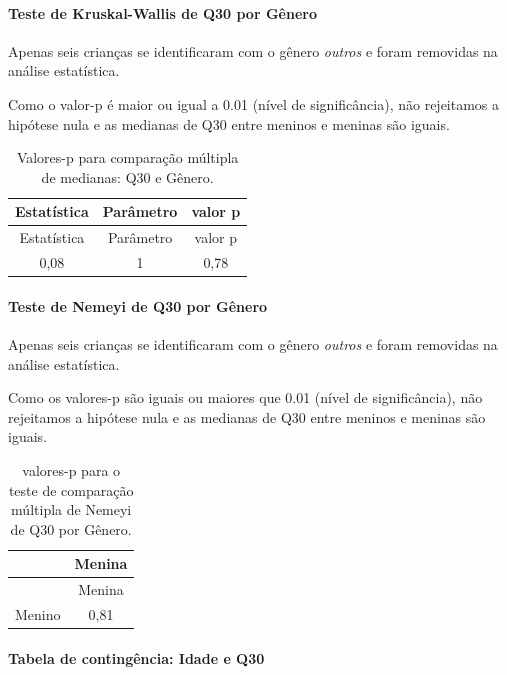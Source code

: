 \documentclass[]{article}
\let\oldparagraph\paragraph
\renewcommand{\paragraph}[1]{\oldparagraph{#1}\mbox{}}
\begin{document}
\hypertarget{teste-de-kruskal-wallis-de-q30-por-guxeanero}{%
\paragraph{Teste de Kruskal-Wallis de Q30 por Gênero}\label{teste-de-kruskal-wallis-de-q30-por-guxeanero}}

Apenas seis crianças se identificaram com o gênero \emph{outros} e foram removidas na análise estatística.

Como o valor-p é maior ou igual a 0.01 (nível de significância), não rejeitamos a hipótese nula e as medianas de Q30 entre meninos e meninas são iguais.

\begin{longtable}[]{@{}ccc@{}}
\caption{\label{tab:unnamed-chunk-973}Valores-p para comparação múltipla de medianas: Q30 e Gênero.}\tabularnewline
\toprule
Estatística & Parâmetro & valor p\tabularnewline
\midrule
\endfirsthead
\toprule
Estatística & Parâmetro & valor p\tabularnewline
\midrule
\endhead
0,08 & 1 & 0,78\tabularnewline
\bottomrule
\end{longtable}

\hypertarget{teste-de-nemeyi-de-q30-por-guxeanero}{%
\paragraph{Teste de Nemeyi de Q30 por Gênero}\label{teste-de-nemeyi-de-q30-por-guxeanero}}

Apenas seis crianças se identificaram com o gênero \emph{outros} e foram removidas na análise estatística.

Como os valores-p são iguais ou maiores que 0.01 (nível de significância), não rejeitamos a hipótese nula e as medianas de Q30 entre meninos e meninas são iguais.

\begin{longtable}[]{@{}lc@{}}
\caption{\label{tab:unnamed-chunk-975}valores-p para o teste de comparação múltipla de Nemeyi de Q30 por Gênero.}\tabularnewline
\toprule
& Menina\tabularnewline
\midrule
\endfirsthead
\toprule
& Menina\tabularnewline
\midrule
\endhead
Menino & 0,81\tabularnewline
\bottomrule
\end{longtable}

\cleardoublepage

\hypertarget{tabela-de-continguxeancia-idade-e-q30}{%
\paragraph{Tabela de contingência: Idade e Q30}\label{tabela-de-continguxeancia-idade-e-q30}}
\end{document}
